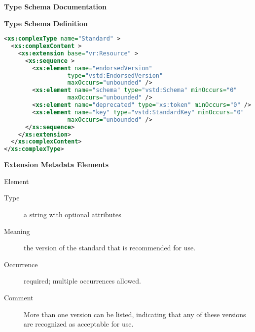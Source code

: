 \documentclass[11pt,a4paper]{ivoa}
\begin{document}
\begin{generated}
\begingroup
        \renewcommand*\descriptionlabel[1]{%
        \hbox to 5.5em{\emph{#1}\hfil}}\vspace{2ex}\noindent\textbf{ Type Schema Documentation}



\vspace{1ex}\noindent\textbf{ Type Schema Definition}

\begin{lstlisting}[language=XML,basicstyle=\footnotesize]
<xs:complexType name="Standard" >
  <xs:complexContent >
    <xs:extension base="vr:Resource" >
      <xs:sequence >
        <xs:element name="endorsedVersion"
                  type="vstd:EndorsedVersion"
                  maxOccurs="unbounded" />
        <xs:element name="schema" type="vstd:Schema" minOccurs="0"
                  maxOccurs="unbounded" />
        <xs:element name="deprecated" type="xs:token" minOccurs="0" />
        <xs:element name="key" type="vstd:StandardKey" minOccurs="0"
                  maxOccurs="unbounded" />
      </xs:sequence>
    </xs:extension>
  </xs:complexContent>
</xs:complexType>
\end{lstlisting}

\vspace{0.5ex}\noindent\textbf{ Extension Metadata Elements}

\begingroup\small\begin{bigdescription}\item[Element \xmlel{endorsedVersion}]
\begin{description}
\item[Type] a string with optional attributes
\item[Meaning] 
                     the version of the standard that is recommended for use.
                   
\item[Occurrence] required; multiple occurrences allowed.
\item[Comment] 
                     More than one version can be listed, indicating
                     that any of these versions are recognized as
                     acceptable for use.  
                   


\end{description}
\end{bigdescription}
\end{generated}
\end{document}
